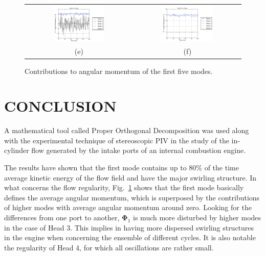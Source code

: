 \documentclass[12pt,a4paper]{article}
\newcommand{\bv}[1]{\mathbf{#1}}
\begin{document}
\begin{figure}[h]
\begin{tabular}{cc}
\includegraphics[width=0.5\textwidth]{./imgs/Lz_H4L2.pdf} & \includegraphics[width=0.5\textwidth]{./imgs/Lz_H4L12.pdf} \\
(e) & (f)
\end{tabular}
 \caption{Contributions to angular momentum of the first five modes.}
 \label{fig: Lz}
\end{figure}

\clearpage


\section{CONCLUSION}

A mathematical tool called Proper Orthogonal Decomposition was used along with the experimental technique of stereoscopic PIV in the study of the in-cylinder flow generated by the intake ports of an internal combustion engine. 

The results have shown that the first mode contains up to 80$\%$ of the time average kinetic energy of the flow field and have the major swirling structure. In what concerns the flow regularity, Fig.~\ref{fig: Lz} shows that the first mode basically defines the average angular momentum, which is superposed by the contributions of higher modes with average angular momentum around zero. Looking for the differences from one port to another, $\bv{\Phi}_1$ is much more disturbed by higher modes in the case of Head 3. This implies in having more dispersed swirling structures in the engine when concerning the ensemble of different cycles. It is also notable the regularity of Head 4, for which all oscillations are rather small.
\end{document}
